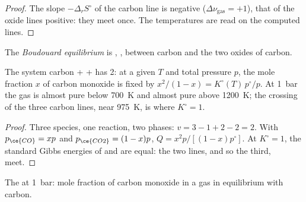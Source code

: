 \begin{proof}
The slope $-\Delta_r S^\circ$ of the carbon line is negative ($\Delta\nu_{\text{gas}}
= +1$), that of the oxide lines positive: they meet once. The temperatures
are read on the computed lines.
\end{proof}

\begin{definition}\label{def:b2:ellingham:boudouard}
The \emph{Boudouard equilibrium} is ,
, between carbon and the two oxides of carbon.
\end{definition}

\begin{proposition}\label{prop:b2:ellingham:boudouard}
The system carbon +  +  has  2: at a given $T$ and total
pressure $p$, the mole fraction $x$ of carbon monoxide is fixed by $x^2/(1 - x)
= K^\circ(T)\,p^\circ/p$. At \qty{1}{bar} the gas is almost pure 
below \qty{700}{K} and almost pure  above \qty{1200}{K}; the crossing of
the three carbon lines, near \qty{975}{K}, is where $K^\circ = 1$.
\end{proposition}

\begin{proof}
Three species, one reaction, two phases: $v = 3 - 1 + 2 - 2 = 2$. With $p_{\ce{CO}}
= xp$ and $p_{\ce{CO2}} = (1 - x)p$, $Q = x^2p/[(1 - x)p^\circ]$. At $K^\circ = 1$,
the standard Gibbs energies of  and  are
equal: the two lines, and so the third, meet.
\end{proof}

\begin{omfigure}

{\small The  at \qty{1}{bar}: mole fraction of carbon
monoxide in a gas in equilibrium with carbon.}
\end{omfigure}

